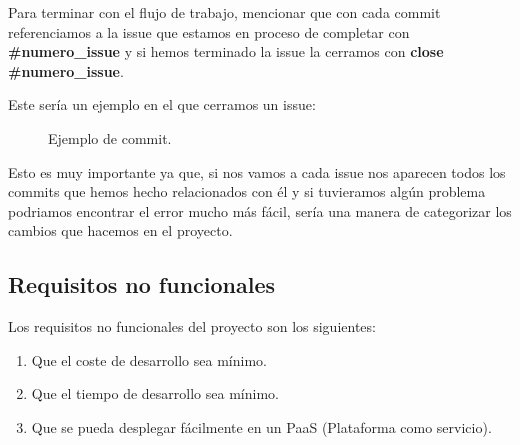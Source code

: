 Para terminar con el flujo de trabajo, mencionar que con cada commit referenciamos a la issue que estamos en proceso de completar con \textbf{\#numero\_issue} y si
hemos terminado la issue la cerramos con \textbf{close \#numero\_issue}.

Este sería un ejemplo en el que cerramos un issue:

\begin{figure}[H]
	\centering
	\noindent{}
	\caption{Ejemplo de commit.}
	\end{figure}

Esto es muy importante ya que, si nos vamos a cada issue nos aparecen todos los commits que hemos hecho relacionados con él y si tuvieramos algún problema podriamos 
encontrar el error mucho más fácil, sería una manera de categorizar los cambios que hacemos en el proyecto.

\subsection{Requisitos no funcionales}

Los requisitos no funcionales del proyecto son los siguientes:

\begin{enumerate}
	\item Que el coste de desarrollo sea mínimo.
	\item Que el tiempo de desarrollo sea mínimo.
	\item Que se pueda desplegar fácilmente en un PaaS (Plataforma como servicio).
  \end{enumerate}